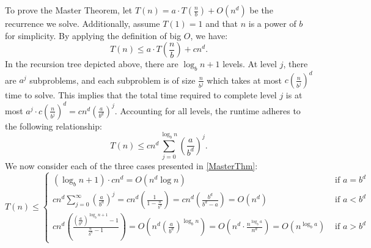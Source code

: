 \documentclass[11pt]{article}
\begin{document}
To prove the Master Theorem, let $T(n) = a \cdot T \left(\frac{n}{b}\right) + O(n^d)$ be the recurrence we solve. Additionally, assume $T(1) = 1$ and that $n$ is a power of $b$ for simplicity. By applying the definition of big $O$, we have:
\begin{equation}
    T(n) \leq a \cdot T\left(\frac{n}{b}\right) + c n^d.
\end{equation}
In the recursion tree depicted above, there are $\log_b n + 1$ levels. At level $j$, there are $a^j$ subproblems, and each subproblem is of size $\frac{n}{b^j}$ which takes at most $c\left(\frac{n}{b^j}\right)^d$ time to solve. This implies that the total time required to complete level $j$ is at most $a^j \cdot c \left(\frac{n}{b^j}\right)^d = cn^d \left(\frac{a}{b^d}\right)^j$. Accounting for all levels, the runtime adheres to the following relationship:
\begin{equation}
    T(n) \leq cn^d \sum_{j=0}^{\log_b n} \left(\frac{a}{b^d}\right)^j.
\end{equation}
We now consider each of the three cases presented in \cref{MasterThm}:
\scriptsize 
\begin{equation}
    T(n) \leq \begin{cases}
        (\log_b n + 1)\cdot cn^d = O(n^d \log n) & \text{ if } a = b^d \\[1em]
        cn^d \sum_{j=0}^\infty \left(\frac{a}{b^d}\right)^j = cn^d \left(\frac{1}{1 - \frac{a}{b^d}}\right) = cn^d\left(\frac{b^d}{b^d - a}\right) = O(n^d) & \text{ if } a < b^d \\[1em]
        cn^d \left(\frac{\left(\frac{a}{b^d}\right)^{\log_b n + 1} - 1}{\frac{a}{b^d} - 1}\right) = O\left(n^d \left(\frac{a}{b^d}\right)^{\log_b n}\right) = O\left(n^d \cdot \frac{n^{\log_b a}}{n^d}\right) = O(n^{\log_b a}) & \text{ if } a > b^d
    \end{cases}
\end{equation}
\normalsize 
\end{document}
